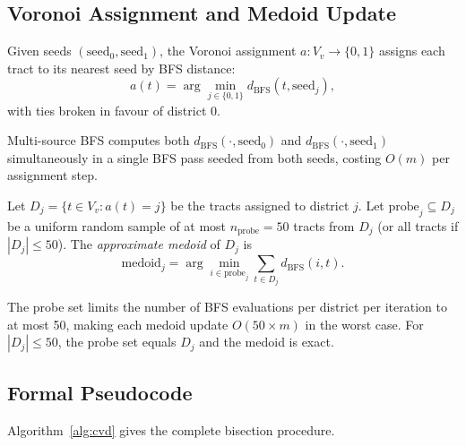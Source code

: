 \subsection{Voronoi Assignment and Medoid Update}

\begin{definition}
\label{def:voronoi-assign}
Given seeds $(\mathrm{seed}_0, \mathrm{seed}_1)$, the Voronoi assignment
$a: V_v \to \{0,1\}$ assigns each tract to its nearest seed by BFS distance:
\[
  a(t) = \arg\min_{j \in \{0,1\}} d_{\mathrm{BFS}}(t, \mathrm{seed}_j),
\]
with ties broken in favour of district 0.
\end{definition}

Multi-source BFS computes both $d_{\mathrm{BFS}}(\cdot, \mathrm{seed}_0)$ and
$d_{\mathrm{BFS}}(\cdot, \mathrm{seed}_1)$ simultaneously in a single BFS pass
seeded from both seeds, costing $O(m)$ per assignment step.

\begin{definition}
\label{def:medoid}
Let $D_j = \{t \in V_v : a(t) = j\}$ be the tracts assigned to district $j$.
Let $\mathrm{probe}_j \subseteq D_j$ be a uniform random sample of at most
$n_{\mathrm{probe}} = 50$ tracts from $D_j$ (or all tracts if $|D_j| \le 50$).
The \emph{approximate medoid} of $D_j$ is
\[
  \mathrm{medoid}_j = \arg\min_{i \in \mathrm{probe}_j}
  \sum_{t \in D_j} d_{\mathrm{BFS}}(i, t).
\]
\end{definition}

The probe set limits the number of BFS evaluations per district per iteration
to at most 50, making each medoid update $O(50 \times m)$ in the worst case.
For $|D_j| \le 50$, the probe set equals $D_j$ and the medoid is exact.

\subsection{Formal Pseudocode}

Algorithm~\ref{alg:cvd} gives the complete \cvd{} bisection procedure.

